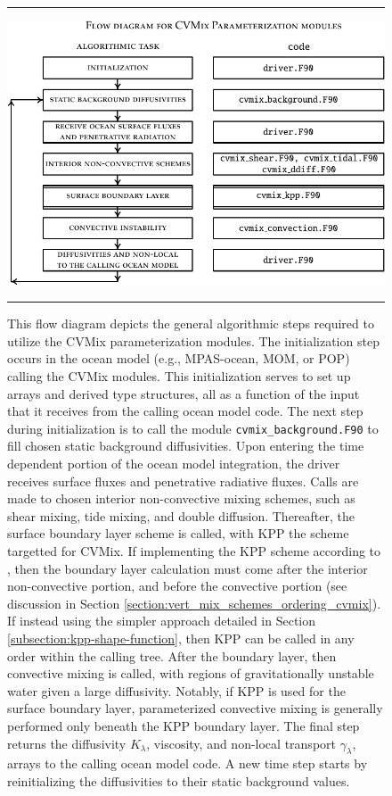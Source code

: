 \begin{figure}[h!t]
\rule{\textwidth}{0.005in}
\begin{center}
\includegraphics[angle=0,width=15cm]{./mfpic_figs/cvmix_flow_diagram.pdf}
\caption[Flow diagram for CVMix schemes]{\sf This flow diagram depicts
  the general algorithmic steps required to utilize the CVMix
  parameterization modules.  The initialization step occurs in the
  ocean model (e.g., MPAS-ocean, MOM, or POP) calling the CVMix
  modules.  This initialization serves to set up arrays and derived
  type structures, all as a function of the input that it receives
  from the calling ocean model code.  The next step during
  initialization is to call the module {\tt cvmix\_background.F90} to
  fill chosen static background diffusivities.  Upon entering the time
  dependent portion of the ocean model integration, the driver
  receives surface fluxes and penetrative radiative fluxes.  Calls are
  made to chosen interior non-convective mixing schemes, such as shear
  mixing, tide mixing, and double diffusion.  Thereafter, the surface
  boundary layer scheme is called, with KPP the scheme targetted for
  CVMix.  If implementing the KPP scheme according to \cite{LargeKPP},
  then the boundary layer calculation must come after the interior
  non-convective portion, and before the convective portion (see
  discussion in Section
  \ref{section:vert_mix_schemes_ordering_cvmix}).  If instead using
  the simpler approach detailed in Section
  \ref{subsection:kpp-shape-function}, then KPP can be called in any
  order within the calling tree.  After the boundary layer, then
  convective mixing is called, with regions of gravitationally
  unstable water given a large diffusivity.  Notably, if KPP is used
  for the surface boundary layer, parameterized convective mixing is
  generally performed only beneath the KPP boundary layer.  The final
  step returns the diffusivity $K_{\lambda}$, viscosity, and non-local
  transport $\gamma_{\lambda}$, arrays to the calling ocean model
  code.  A new time step starts by reinitializing the diffusivities to
  their static background values.}
\label{fig:vertical_mix_flow_cvmix}
\end{center}
\rule{\textwidth}{0.005in}
\end{figure}




